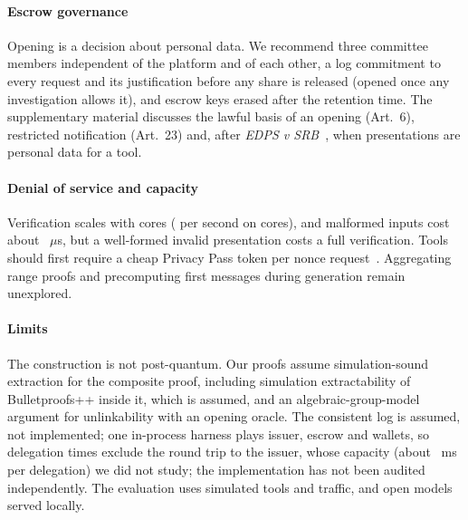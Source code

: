 \paragraph*{Escrow governance} Opening is a decision about personal data. We recommend three committee members independent of the platform and of each other, a log commitment to every request and its justification before any share is released (opened once any investigation allows it), and escrow keys erased after the retention time. The supplementary material discusses the lawful basis of an opening (Art.~6), restricted notification (Art.~23) and, after \emph{EDPS v SRB}~\cite{cjeu2025srb}, when presentations are personal data for a tool.

\paragraph*{Denial of service and capacity} Verification scales with cores (\ThrMpRate{} per second on \ThrMpCores{} cores), and malformed inputs cost about \ThrGarbageUs{}~$\mu$s, but a well-formed invalid presentation costs a full verification. Tools should first require a cheap Privacy Pass token per nonce request~\cite{rfc9577}. Aggregating range proofs and precomputing first messages during generation remain unexplored.

\paragraph*{Limits} The construction is not post-quantum. Our proofs assume simulation-sound extraction for the composite proof, including simulation extractability of Bulletproofs++ inside it, which is assumed, and an algebraic-group-model argument for unlinkability with an opening oracle. The consistent log is assumed, not implemented; one in-process harness plays issuer, escrow and wallets, so delegation times exclude the round trip to the issuer, whose capacity (about \DelIssuerMs{}~ms per delegation) we did not study; the implementation has not been audited independently. The evaluation uses simulated tools and traffic, and open models served locally.

